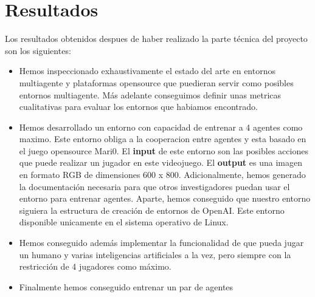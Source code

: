 \section{Resultados}

Los resultados obtenidos despues de haber realizado la parte técnica del proyecto son los siguientes:
\begin{itemize}
    \item Hemos inspeccionado exhaustivamente el estado del arte en entornos multiagente y plataformas opensource que puedieran servir como posibles entornos multiagente. Más adelante conseguimos definir unas metricas cualitativas para evaluar los entornos que habiamos encontrado.
    \item Hemos desarrollado un entorno con capacidad de entrenar a 4 agentes como maximo. Este entorno obliga a la cooperacion entre agentes y esta basado en el juego opensource Mari0. El \textbf{input} de este entorno son las posibles acciones que puede realizar un jugador en este videojuego. El \textbf{output} es una imagen en formato RGB de dimensiones 600 x 800. Adicionalmente, hemos generado la documentación necesaria para que otros investigadores puedan usar el entorno para entrenar agentes. Aparte, hemos conseguido que nuestro entorno siguiera la estructura de creación de entornos de OpenAI. Este entorno disponible unicamente en el sistema operativo de Linux.
    \item Hemos conseguido además implementar la funcionalidad de que pueda jugar un humano y varias inteligencias artificiales a la vez, pero siempre con la restricción de 4 jugadores como máximo.
    \item Finalmente hemos conseguido entrenar un par de agentes

\end{itemize}
 

